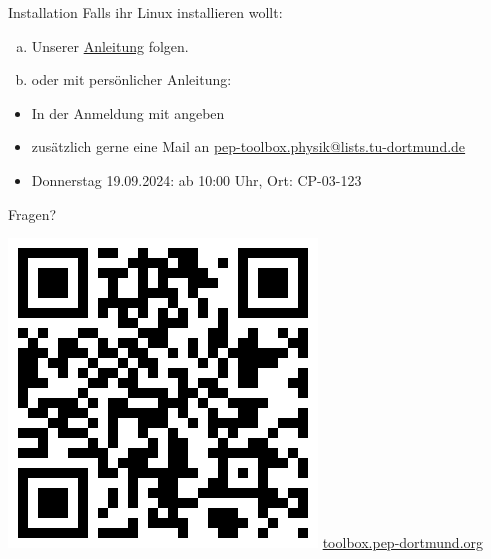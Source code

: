 \begin{frame}{Installation}
  \huge
  Falls ihr Linux installieren wollt:\\[0.5\baselineskip]
	\begin{enumerate}[a)]
    \item Unserer \href{https://toolbox.pep-dortmund.org/install/dualboot/}{Anleitung} folgen.
    \item oder mit persönlicher Anleitung:
  \end{enumerate}
  \begin{itemize}
    \item In der Anmeldung mit angeben
    \item zusätzlich gerne eine Mail an \href{mailto:pep-toolbox.physik@lists.tu-dortmund.de}{pep-toolbox.physik@lists.tu-dortmund.de}
    \item Donnerstag 19.09.2024: ab 10:00 Uhr, Ort: CP-03-123
  \end{itemize}
\end{frame}
\begin{frame}
  \begin{minipage}{.5\textwidth}
    \Huge\centering
    \textcolor{red!70!black}{Fragen?}
  \end{minipage}
  \begin{minipage}{.49\textwidth}
    \centering
    \includegraphics[width=.8\textwidth]{../qrcode/toolbox_qrcode.png}
    \Large
    \url{toolbox.pep-dortmund.org}
  \end{minipage}
\end{frame}

